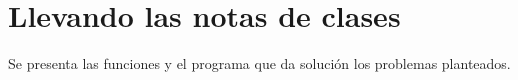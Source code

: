\section{Llevando las notas de clases}

  Se presenta las funciones y el programa que da solución los problemas planteados.
  
  
